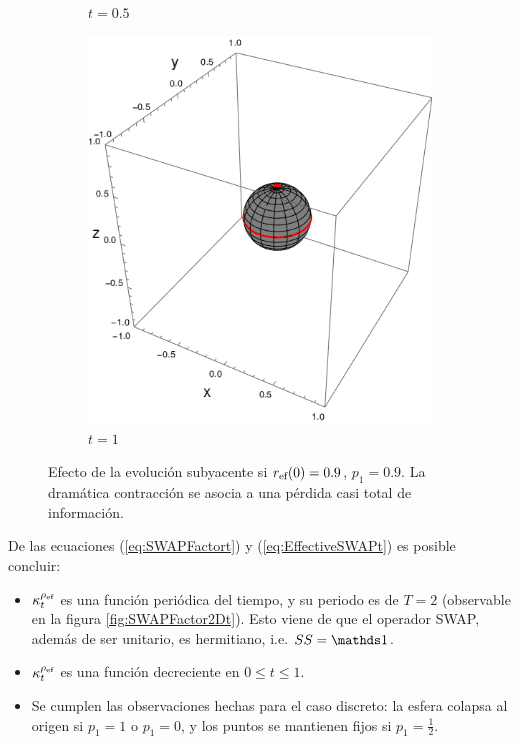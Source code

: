 \begin{figure}[ht!]
\begin{subfigure}{0.32\textwidth}
    \caption{$t=0.5$}
  \end{subfigure}
  \begin{subfigure}{0.32\textwidth}
    \centering
    \includegraphics[width=0.9\linewidth]{chapter3/figures_toy/sphere_swapcontraction_t=1.0_z=0.9_p=0.9.png}
    \caption{$t=1$}
  \end{subfigure}
  \caption{Efecto de la evolución subyacente si $r_{\text{ef}}(0)=0.9$, $p_{1}=0.9$. La dramática contracción se asocia a una pérdida casi total de información.}
  \label{fig:SWAPFactorSequence}
  \end{figure}

De las ecuaciones (\ref{eq:SWAPFactort}) y (\ref{eq:EffectiveSWAPt}) es posible concluir:
\begin{itemize}
  \item $\kappa_{t}^{\rho_{\text{ef}}}$ es una función periódica del tiempo, y su periodo es de $T=2$ (observable en la figura \ref{fig:SWAPFactor2Dt}). Esto viene de que el operador SWAP, además de ser unitario, es hermitiano, i.e. $SS=\Id$.
  \item $\kappa_{t}^{\rho_{\text{ef}}}$ es una función decreciente en $0\leq t\leq 1$.
  \item Se cumplen las observaciones hechas para el caso discreto: la esfera colapsa al origen si $p_{1}=1$ o $p_{1}=0$, y los puntos se mantienen fijos si $p_{1}=\frac{1}{2}$.
\end{itemize}

